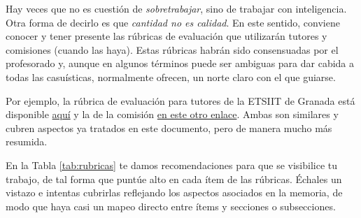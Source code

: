 Hay veces que no es cuestión de \textit{sobretrabajar}, sino de trabajar con inteligencia. Otra forma de decirlo es que {\it cantidad no es calidad}. En este sentido, conviene conocer y tener presente las rúbricas de evaluación que utilizarán tutores y comisiones (cuando las haya). Estas rúbricas habrán sido consensuadas por el profesorado y, aunque en algunos términos puede ser ambiguas para dar cabida a todas las casuísticas, normalmente ofrecen, un norte claro con el que guiarse.  

Por ejemplo, la rúbrica de evaluación para tutores de la ETSIIT de Granada está disponible \href{https://grados.ugr.es/informatica/pages/infoacademica/tfg/evaluacion/rubrica_informe_tutores_tfg/! }{aquí} y la de la comisión \href{https://grados.ugr.es/informatica/pages/infoacademica/tfg/evaluacion/rubrica_comision_evaluadora_tfg/!}{en este otro enlace}. Ambas son similares y cubren aspectos ya tratados en este documento, pero de manera mucho más resumida.

En la Tabla \ref{tab:rubricas} te damos recomendaciones para que se visibilice tu trabajo, de tal forma que puntúe alto en cada ítem de las rúbricas. Échales un vistazo e intentas cubrirlas reflejando los aspectos asociados en la memoria, de modo que haya casi un mapeo directo entre ítems y secciones o subsecciones.

